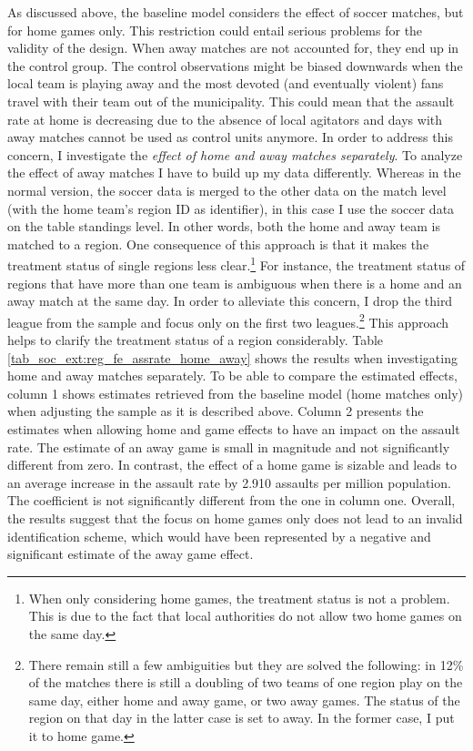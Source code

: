 \documentclass[11pt, a4paper]{article} %
\begin{document}
As discussed above, the baseline model considers the effect of soccer matches, but for home games only. This restriction could entail serious problems for the validity of the design. When away matches are not accounted for, they end up in the control group. The control observations might be biased downwards when the local team is playing away and the most devoted (and eventually violent) fans travel with their team out of the municipality. This could mean that the assault rate at home is decreasing due to the absence of local agitators and days with away matches cannot be used as control units anymore. In order to address this concern, I investigate the \textit{effect of home and away matches separately}. To analyze the effect of away matches I have to build up my data differently. Whereas in the normal version, the soccer data is merged to the other data on the match level (with the home team's region ID as identifier), in this case I use the soccer data on the table standings level. In other words, both the home and away team is matched to a region. One consequence of this approach is that it makes the treatment status of single regions less clear.\footnote{When only considering home games, the treatment status is not a problem. This is due to the fact that local authorities do not allow two home games on the same day.} For instance, the treatment status of regions that have more than one team is ambiguous when there is a home and an away match at the same day. In order to alleviate this concern, I drop the third league from the sample and focus only on the first two leagues.\footnote{There remain still a few ambiguities but they are solved the following: in 12\% of the matches there is still a doubling of two teams of one region play on the same day, either home and away game, or two away games. The status of the region on that day in the latter case is set to away. In the former case, I put it to home game.} This approach helps to clarify the treatment status of a region considerably. Table \ref{tab_soc_ext:reg_fe_assrate_home_away} shows the results when investigating home and away matches separately. To be able to compare the estimated effects, column 1 shows estimates retrieved from the baseline model (home matches only) when adjusting the sample as it is described above. Column 2 presents the estimates when allowing home and game effects to have an impact on the assault rate. The estimate of an away game is small in magnitude and not significantly different from zero. In contrast, the effect of a home game is sizable and leads to an average increase in the assault rate by 2.910 assaults per million population. The coefficient is not significantly different from the one in column one. Overall, the results suggest that the focus on home games only does not lead to an invalid identification scheme, which would have been represented by a negative and significant estimate of the away game effect. 
\end{document}
